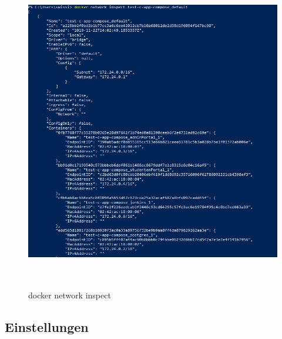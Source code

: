 \documentclass[a4paper,12pt,oneside]{book}
\begin{document}
\begin{figure}[h!]
	\begin{center}
		\includegraphics[width=14cm, height=14cm]{network-inspect.PNG}
		\caption{docker network inspect} 
		\label{docker network inspect} 
	\end{center}
\end{figure}
\subsection{Einstellungen}
\end{document}
